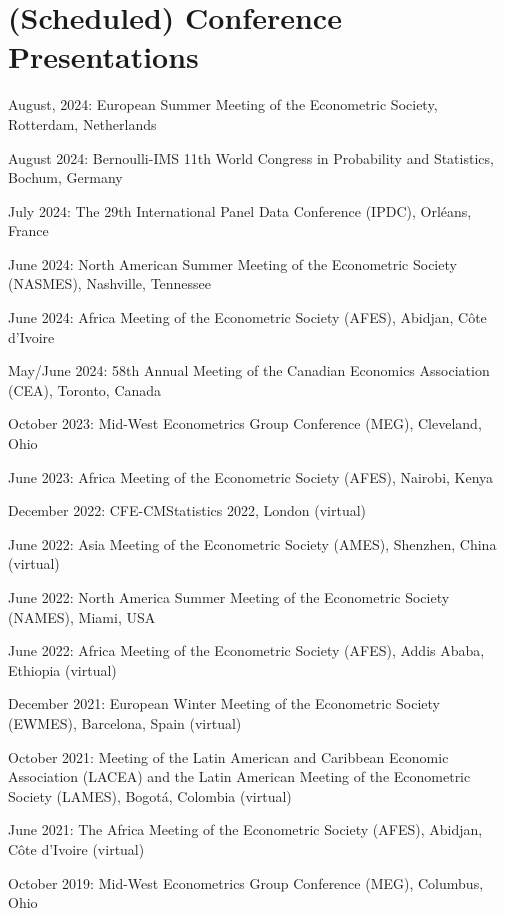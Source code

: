 \documentclass[12pt,letterpaper]{article}
\renewenvironment{itemize}{
  \begin{list}{}{
    \setlength{\leftmargin}{1.5em}
  }
}{
  \end{list}
}
\begin{document}
\section*{(Scheduled) Conference Presentations}
\begin{itemize}
  \item August, 2024: European Summer Meeting of the Econometric Society, Rotterdam, Netherlands
  
  \item August 2024: Bernoulli-IMS 11th World Congress in Probability and Statistics, Bochum, Germany
  
  \item July 2024: The 29th International Panel Data Conference (IPDC), Orléans, France
  
  \item June 2024: North American Summer Meeting of the Econometric Society (NASMES), Nashville, Tennessee
  
  \item June 2024: Africa Meeting of the Econometric Society (AFES), Abidjan, Côte d'Ivoire
  
  \item May/June 2024: 58th Annual Meeting of the Canadian Economics Association (CEA), Toronto, Canada

  \item October 2023: Mid-West Econometrics Group Conference (MEG), Cleveland, Ohio
  \item June 2023: Africa Meeting of the Econometric Society (AFES), Nairobi, Kenya
  \item December 2022: CFE-CMStatistics 2022, London (virtual)
  \item June 2022: Asia Meeting of the Econometric Society (AMES), Shenzhen, China (virtual)
  \item June 2022: North America Summer Meeting of the Econometric Society (NAMES), Miami, USA
  \item June 2022: Africa Meeting of the Econometric Society (AFES), Addis Ababa, Ethiopia (virtual)
  \item December 2021: European Winter Meeting of the Econometric Society (EWMES), Barcelona, Spain (virtual)
  \item October 2021: Meeting of the Latin American and Caribbean Economic Association (LACEA) and the Latin American Meeting of the Econometric Society (LAMES), Bogotá, Colombia (virtual)
	\item June 2021: The Africa Meeting of the Econometric Society (AFES), Abidjan, C\^ote d'Ivoire (virtual)
	\item October 2019: Mid-West Econometrics Group Conference (MEG), Columbus, Ohio
\end{itemize}
\end{document}
